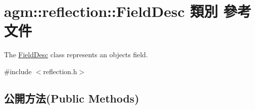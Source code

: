 \hypertarget{classagm_1_1reflection_1_1_field_desc}{}\section{agm\+:\+:reflection\+:\+:Field\+Desc 類別 參考文件}
\label{classagm_1_1reflection_1_1_field_desc}


The \hyperlink{classagm_1_1reflection_1_1_field_desc}{Field\+Desc} class represents an object\textquotesingle{}s field.  




{\ttfamily \#include $<$reflection.\+h$>$}

\subsection*{公開方法(Public Methods)}
